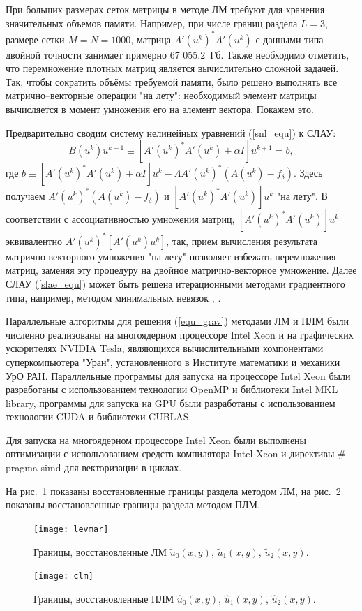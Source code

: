 При больших размерах сеток матрицы в методе ЛМ требуют для хранения значительных объемов памяти. Например, при числе границ раздела $L=3$, размере сетки $M=N=1000$, матрица $A'(u^k)^*A'(u^k)$ с данными типа двойной точности занимает примерно  67 055.2~Гб. Также необходимо отметить, что перемножение плотных матриц является вычислительно сложной задачей. Так, чтобы сократить объёмы требуемой памяти, было решено выполнять все матрично--векторные операции "на лету": необходимый элемент матрицы вычисляется в момент умножения его на элемент вектора. Покажем это.

Предварительно сводим систему нелинейных уравнений (\ref{snl_equ}) к СЛАУ:
\begin{equation}\label{slae_equ}
B(u^k)u^{k+1}\equiv[A'(u^k)^*A'(u^k)+\alpha I]u^{k+1}=b,
\end{equation}
где $b\equiv[A'(u^k)^*A'(u^k)+\alpha I]u^k-\Lambda A'(u^k)^*(A(u^k)-f_\delta)$. Здесь получаем  $A'(u^k)^*(A(u^k)-f_\delta)$ и $[A'(u^k)^*A'(u^k)]u^k$ "на лету". В соответствии с ассоциативностью умножения матриц, $[A'(u^k)^*A'(u^k)]u^k$ эквивалентно $A'(u^k)^*[A'(u^k)u^k]$, так, прием вычисления результата матрично-векторного умножения "на лету" позволяет избежать перемножения матриц, заменяя эту процедуру на двойное матрично-векторное умножение. Далее СЛАУ (\ref{slae_equ}) может быть решена итерационными методами градиентного типа, например, методом минимальных невязок  \cite{VasEre2009}, \cite{BachZhid1987}.

Параллельные алгоритмы для решения (\ref{equ_grav}) методами ЛМ и ПЛМ были численно реализованы на многоядерном процессоре Intel Xeon и на графических ускорителях NVIDIA Tesla, являющихся вычислительными компонентами суперкомпьютера "Уран", установленного в Институте математики и механики УрО РАН. Параллельные программы для запуска на процессоре Intel Xeon были разработаны с использованием технологии OpenMP и библиотеки Intel MKL library, программы для запуска на GPU были разработаны с использованием технологии CUDA и библиотеки CUBLAS. 

Для запуска на многоядерном процессоре Intel Xeon были выполнены оптимизации с использованием средств компилятора Intel Xeon и директивы \# pragma simd для векторизации в циклах.

На рис.~\ref{fig:rlmm} показаны восстановленные границы раздела методом ЛМ, на рис.~\ref{fig:rclmm} показаны восстановленные границы раздела методом ПЛМ.
\begin{figure}
	\centering
	\texttt{[image: levmar]}
	\caption{Границы, восстановленные ЛМ $\tilde{u}_0(x,y)$, $\tilde{u}_1(x,y)$, $\tilde{u}_2(x,y)$.}
	\label{fig:rlmm}
\end{figure}
\begin{figure}
	\centering
	\texttt{[image: clm]}
	\caption{Границы, восстановленные ПЛМ $\hat{u}_0(x,y)$, $\hat{u}_1(x,y)$, $\hat{u}_2(x,y)$.}
	\label{fig:rclmm}
\end{figure}

